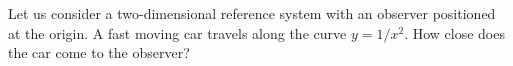 \begin{multicols}{2}

\problem Let us consider a two-dimensional reference system with an observer
positioned at the origin. A fast moving car travels along the curve $y=1/x^2$. How
close does the car come to the observer?



\end{multicols}
